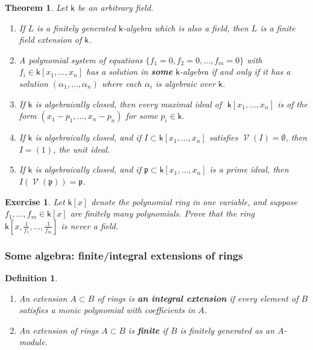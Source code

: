 \documentclass[11pt]{article}
\renewcommand{\k}{\mathsf{k}}
\newcommand{\fp}{\mathfrak{p}}
\DeclareMathOperator{\V}{\mathcal{V}}
\renewcommand{\k}{\mathsf{k}}
\newtheorem{theorem}{Theorem}[section]
\newtheorem{definition}{Definition}[section]
\newtheorem{exercise}{Exercise}[section]
\begin{document}
\begin{theorem}
Let \(\k\) be an arbitrary field.

\begin{enumerate}
\item If \(L\) is a finitely generated \(\k\)-algebra which is also a field, then \(L\) is a finite field extension of \(\k\).

\item A polynomial system of equations \(\big\{f_1=0, f_2=0, \dots, f_m =0 \big\}\) with \(f_i \in \k[x_1, \dots, x_n]\) has a solution in \textbf{\emph{some}} \(\k\)-algebra if and only if it has a solution \((\alpha_1, \dots, \alpha_n)\) where each \(\alpha_i\) is algebraic over \(\k\).

\item If \(\k\) is algebraically closed, then every maximal ideal of \(\,\,\k[x_1, \dots, x_n]\) is of the form \((x_1-p_1, \dots, x_n-p_n)\) for some \(p_i \in \k\).

\item If \(\k\) is algebraically closed, and if \(I \subset \k[x_1, \dots, x_n]\) satisfies \(\V(I) = \emptyset\), then \(I = (1)\), the unit ideal.
\item If \(\k\) is algebraically closed, and if \(\fp \subset \k[x_1, \dots, x_n]\) is a prime ideal, then \(I(\V(\fp)) = \fp\).
\end{enumerate}
\end{theorem}


\begin{exercise}
Let \(\k[x]\) denote the polynomial ring in one variable, and suppose \(f_1, \dots, f_m \in \k[x]\) are finitely many polynomials.  Prove that the ring \(\k[x, \frac{1}{f_1}, \dots, \frac{1}{f_m}]\) is never a field. 
\end{exercise}


\subsubsection{Some  algebra: finite/integral extensions of rings}
\label{sec:org5c37bcf}

\begin{definition}
\begin{enumerate}
\item An extension \(A \subset B\) of rings is \textbf{\emph{an integral extension}} if every element of \(B\) satisfies a monic polynomial with coefficients in \(A\).

\item An extension of rings \(A \subset B\) is \textbf{\emph{finite}} if \(B\) is finitely generated as an \(A\)-module.
\end{enumerate}
\end{definition}
\end{document}
